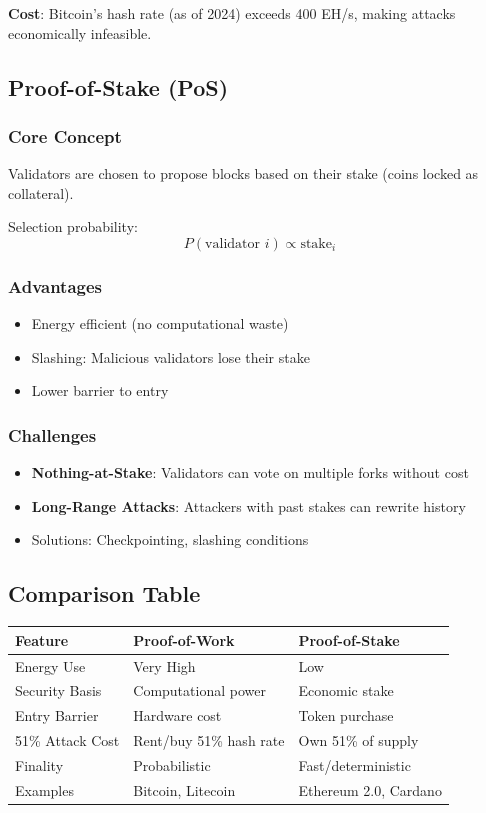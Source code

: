 \documentclass[11pt,a4paper]{article}
\begin{document}
\textbf{Cost}: Bitcoin's hash rate (as of 2024) exceeds 400 EH/s, making attacks economically infeasible.

\subsection{Proof-of-Stake (PoS)}

\subsubsection{Core Concept}

Validators are chosen to propose blocks based on their stake (coins locked as collateral).

Selection probability:
\[
P(\text{validator } i) \propto \text{stake}_i
\]

\subsubsection{Advantages}
\begin{itemize}
  \item Energy efficient (no computational waste)
  \item Slashing: Malicious validators lose their stake
  \item Lower barrier to entry
\end{itemize}

\subsubsection{Challenges}
\begin{itemize}
  \item \textbf{Nothing-at-Stake}: Validators can vote on multiple forks without cost
  \item \textbf{Long-Range Attacks}: Attackers with past stakes can rewrite history
  \item Solutions: Checkpointing, slashing conditions
\end{itemize}

\subsection{Comparison Table}

\begin{center}
\begin{tabular}{|l|l|l|}
\hline
\textbf{Feature} & \textbf{Proof-of-Work} & \textbf{Proof-of-Stake} \\
\hline
Energy Use & Very High & Low \\
Security Basis & Computational power & Economic stake \\
Entry Barrier & Hardware cost & Token purchase \\
51\% Attack Cost & Rent/buy 51\% hash rate & Own 51\% of supply \\
Finality & Probabilistic & Fast/deterministic \\
Examples & Bitcoin, Litecoin & Ethereum 2.0, Cardano \\
\hline
\end{tabular}
\end{center}
\end{document}
